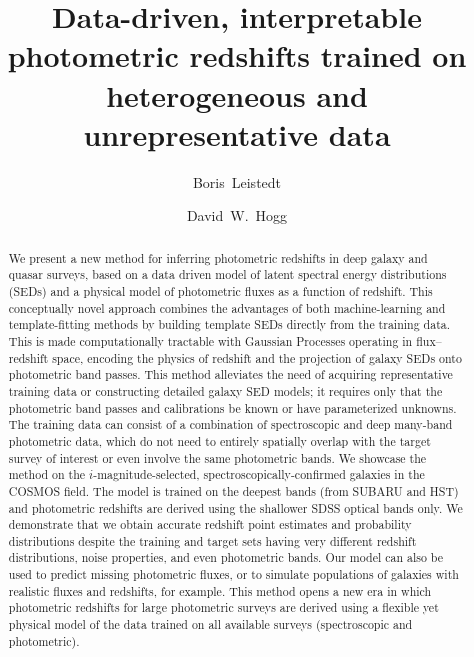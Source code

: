 \documentclass[aps,prd,showpacs,superscriptaddress,groupedaddress]{revtex4}  %
\begin{document}
 
\title{\hspace*{-2mm}Data-driven, interpretable photometric redshifts trained on heterogeneous and unrepresentative data }

\author{Boris~Leistedt}
  
\author{David~W.~Hogg}
  
\begin{abstract}
We present a new method for inferring photometric redshifts in deep galaxy and quasar surveys, based on a data driven model of latent spectral energy distributions (SEDs) and a physical model of photometric fluxes as a function of redshift. This conceptually novel approach combines the advantages of both machine-learning and template-fitting methods by building template SEDs directly from the training data. This is made computationally tractable with Gaussian Processes operating in flux--redshift space, encoding the physics of redshift and the projection of galaxy SEDs onto photometric band passes. This method alleviates the need of acquiring representative training data or constructing detailed galaxy SED models; it requires only that the photometric band passes and calibrations be known or have parameterized unknowns. The training data can consist of a combination of spectroscopic and deep many-band photometric data, which do not need to entirely spatially overlap with the target survey of interest or even involve the same photometric bands. We showcase the method on the $i$-magnitude-selected, spectroscopically-confirmed galaxies in the COSMOS field. The model is trained on the deepest bands (from SUBARU and HST) and photometric redshifts are derived using the shallower SDSS optical bands only. We demonstrate that we obtain accurate redshift point estimates and probability distributions despite the training and target sets having very different redshift distributions, noise properties, and even photometric bands. Our model can also be used to predict missing photometric fluxes, or to simulate populations of galaxies with realistic fluxes and redshifts, for example. This method opens a new era in which photometric redshifts for large photometric surveys are derived using a flexible yet physical model of the data trained on all available surveys (spectroscopic and photometric).
\end{abstract}
\end{document}
